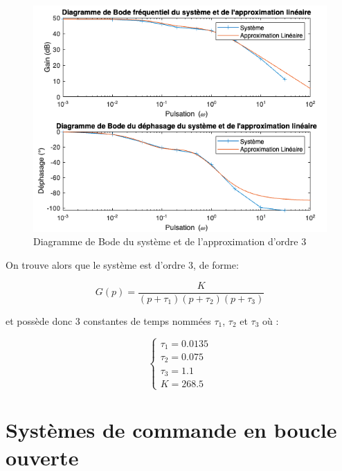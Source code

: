\documentclass[12pt]{report}
\begin{document}
\begin{figure}[!h]
  \centering
  \includegraphics[scale=0.7]{fig/bode_diagram.png}
  \caption{Diagramme de Bode du système et de l'approximation d'ordre 3}
  \vspace{0.5cm}
\end{figure}

On trouve alors que le système est d'ordre 3, de forme:

\vspace{0.5cm}
\begin{equation}
  G(p) = \frac{K}{(p + \tau_1)(p + \tau_2)(p + \tau_3)}
\end{equation}
\vspace{0.5cm}

et possède donc 3 constantes de temps nommées
$\tau_1$, $\tau_2$ et $\tau_3$ où :

\vspace{0.5cm}
\begin{equation}
  \left\{
  \begin{matrix}
    \tau_1 = 0.0135 \\
    \tau_2 = 0.075 \\
    \tau_3 = 1.1 \\
    K = 268.5
  \end{matrix}
  \right.
\end{equation}
\vspace{0.5cm}

\newpage

\section{Systèmes de commande en boucle ouverte}
\end{document}
